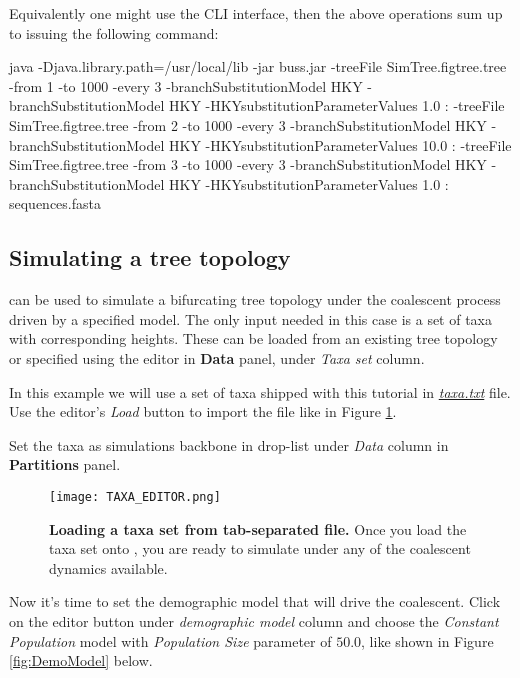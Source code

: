 Equivalently one might use the CLI interface, then the above operations sum up to issuing the following command:

\begin{code}
java -Djava.library.path=/usr/local/lib -jar buss.jar 
-treeFile SimTree.figtree.tree -from 1 -to 1000 -every 3 -branchSubstitutionModel HKY -branchSubstitutionModel HKY -HKYsubstitutionParameterValues 1.0 :
-treeFile SimTree.figtree.tree -from 2 -to 1000 -every 3 -branchSubstitutionModel HKY -branchSubstitutionModel HKY -HKYsubstitutionParameterValues 10.0 :
-treeFile SimTree.figtree.tree -from 3 -to 1000 -every 3 -branchSubstitutionModel HKY -branchSubstitutionModel HKY -HKYsubstitutionParameterValues 1.0 :
sequences.fasta
\end{code}

\subsection{Simulating a tree topology}
{\bussname} can be used to simulate a bifurcating tree topology under the coalescent process driven by a specified model. 
The only input needed in this case is a set of taxa with corresponding heights. 
These can be loaded from an existing tree topology or specified using the editor in \textbf{Data} panel, under \emph{Taxa set} column.

In this example we will use a set of taxa shipped with this tutorial in \href{http://rega.kuleuven.be/cev/ecv/software/buss_files/taxa.txt}{\emph{taxa.txt}} file. Use the editor's \emph{Load} button to import the file like in Figure \ref{fig:TaxaEditor}.

Set the taxa as simulations backbone in drop-list under \emph{Data} column in \textbf{Partitions} panel.

\begin{figure}[h!]
\centering
\texttt{[image: TAXA\_EDITOR.png]} 
\caption{
{ \footnotesize 
{\bf Loading a taxa set from tab-separated file.}
Once you load the taxa set onto {\bussname}, you are ready to simulate under any of the coalescent dynamics available.
} %
}
\label{fig:TaxaEditor}
\end{figure}   

Now it's time to set the demographic model that will drive the coalescent. Click on the editor button under \emph{demographic model} column and choose the \emph{Constant Population} model with \emph{Population Size} parameter of $50.0$, like shown in Figure \ref{fig:DemoModel} below.

